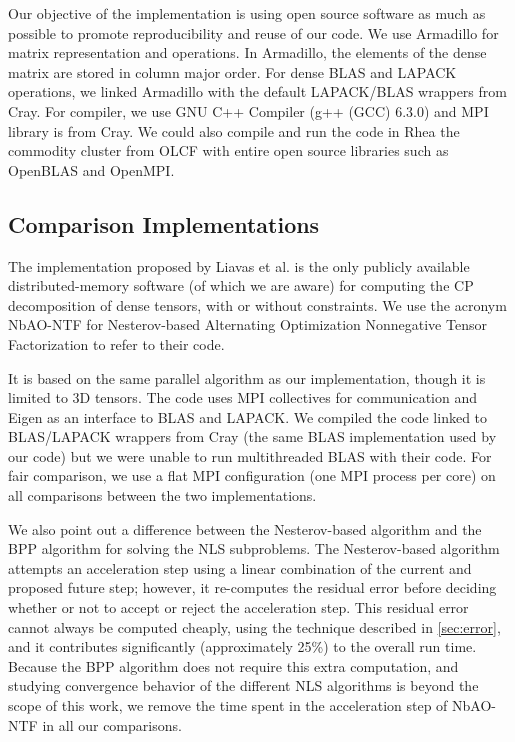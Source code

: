 Our objective of the implementation is using open source software as much as possible 
to promote reproducibility and reuse of our code.
We use Armadillo \cite{sanderson2010} for matrix representation
and operations.  
In Armadillo, the elements of the dense matrix are stored in column major order.
For dense BLAS and LAPACK operations, we linked Armadillo with the default LAPACK/BLAS wrappers from Cray. 
For compiler, we use GNU C++ Compiler (g++ (GCC) 6.3.0) and MPI library is from Cray.  We could also 
compile and run the code in Rhea the commodity cluster from OLCF with entire open source libraries such as OpenBLAS and OpenMPI. 

\subsection{Comparison Implementations}
The implementation proposed by Liavas et al. \cite{LK+17b} is the only publicly available distributed-memory software (of which we are aware) for computing the CP decomposition of dense tensors, with or without constraints.
We use the acronym NbAO-NTF for Nesterov-based Alternating Optimization Nonnegative Tensor Factorization to refer to their code.

It is based on the same parallel algorithm as our implementation, though it is limited to 3D tensors.
The code uses MPI collectives for communication and Eigen \cite{eigenweb} as an interface to BLAS and LAPACK.
We compiled the code linked to BLAS/LAPACK wrappers from Cray  (the same BLAS implementation used by our code) but we were unable to run multithreaded BLAS with their code.
For fair comparison, we use a flat MPI configuration (one MPI process per core) on all comparisons between the two implementations.

We also point out a difference between the Nesterov-based algorithm and the BPP algorithm for solving the NLS subproblems.
The Nesterov-based algorithm attempts an acceleration step using a linear combination of the current and proposed future step; however, it re-computes the residual error before deciding whether or not to accept or reject the acceleration step.
This residual error cannot always be computed cheaply, using the technique described in \cref{sec:error}, and it contributes significantly (approximately 25\%) to the overall run time.
Because the BPP algorithm does not require this extra computation, and studying convergence behavior of the different NLS algorithms is beyond the scope of this work, we remove the time spent in the acceleration step of NbAO-NTF in all our comparisons.

